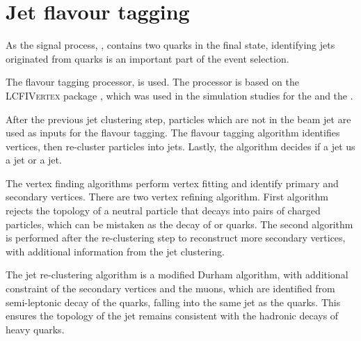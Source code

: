 \section{Jet flavour tagging}
\label{sec:doubleHiggsFlavourTagging}

As the signal process, \eeToHHbbWWHad,  contains two \Pbottom quarks in the final state, identifying jets originated from \Pbottom quarks is an important part of the event selection.



The flavour tagging processor, \lcfiplus \cite{Suehara:2015ura} is used. The processor is based on the \textsc{LCFIVertex} package \cite{Bailey:2009ui}, which was used in the simulation studies for the \ILCloi \cite{Abe:2010aa,Aihara:2009ad} and the \CLICcdr \cite{Linssen:2012hp}.

After the previous jet clustering step, particles which are not in the beam jet are used as inputs for the flavour tagging. The flavour tagging algorithm identifies vertices, then re-cluster particles into jets. Lastly, the algorithm decides if a jet us a \Pbottom jet or a \Pcharm jet.


The vertex finding algorithms perform vertex fitting and identify primary and secondary vertices. There are two vertex refining algorithm. First algorithm rejects the topology of a  neutral particle that decays into pairs of charged particles, which can be mistaken as  the decay of \Pbottom or \Pcharm quarks. The second algorithm is performed after the re-clustering step to reconstruct more secondary vertices, with additional information from the jet clustering.

The jet re-clustering algorithm is a modified Durham algorithm, with additional constraint of the secondary vertices and the muons, which are identified from semi-leptonic decay of the quarks, falling into the same  jet as the quarks. This ensures the topology of the jet remains consistent with the hadronic decays of heavy quarks.


